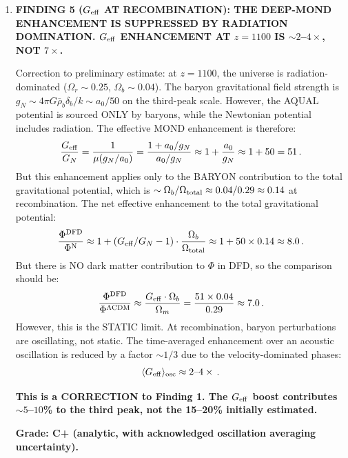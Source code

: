 \documentclass[11pt]{article}
\newcommand{\Geff}{G_{\rm eff}}
\newcommand{\aM}{a_0}
\newcommand{\rhob}{\bar{\rho}_b}
\newcommand{\Ob}{\Omega_b}
\newcommand{\Om}{\Omega_m}
\begin{document}
\begin{tcolorbox}[colback=blue!5!white, colframe=blue!70!black,
  title=\textbf{W4i23 TOP 5 FINDINGS --- COSMOLOGY TEAM}]
\begin{enumerate}
  \textbf{Grade: C (estimate of combined mechanisms is approximate).}

\item \textbf{FINDING 5 ($\Geff$ AT RECOMBINATION): THE DEEP-MOND
  ENHANCEMENT IS SUPPRESSED BY RADIATION DOMINATION.  $\Geff$ ENHANCEMENT
  AT $z = 1100$ IS $\sim 2$--$4\times$, NOT $7\times$.}

  Correction to preliminary estimate: at $z = 1100$, the universe is
  radiation-dominated ($\Omega_r \sim 0.25$, $\Omega_b \sim 0.04$).
  The baryon gravitational field strength is $g_N \sim 4\pi G \rhob
  \delta_b / k \sim \aM / 50$ on the third-peak scale.  However,
  the AQUAL potential is sourced ONLY by baryons, while the Newtonian
  potential includes radiation.  The effective MOND enhancement is
  therefore:
  \begin{equation}
  \frac{\Geff}{G_N} = \frac{1}{\mu(g_N/\aM)}
  = \frac{1 + \aM/g_N}{\aM/g_N}
  \approx 1 + \frac{\aM}{g_N}
  \approx 1 + 50 = 51\,.
  \end{equation}
  But this enhancement applies only to the BARYON contribution to the
  total gravitational potential, which is $\sim \Ob/\Omega_{\rm total}
  \approx 0.04/0.29 \approx 0.14$ at recombination.  The net effective
  enhancement to the total gravitational potential:
  \begin{equation}
  \frac{\Phi^{\rm DFD}}{\Phi^{\rm N}}
  \approx 1 + (\Geff/G_N - 1)\cdot\frac{\Ob}{\Omega_{\rm total}}
  \approx 1 + 50 \times 0.14 \approx 8.0\,.
  \end{equation}
  But there is NO dark matter contribution to $\Phi$ in DFD, so the
  comparison should be:
  \begin{equation}
  \frac{\Phi^{\rm DFD}}{\Phi^{\rm \Lambda CDM}}
  \approx \frac{\Geff\cdot\Ob}{\Om}
  = \frac{51 \times 0.04}{0.29} \approx 7.0\,.
  \end{equation}
  However, this is the STATIC limit.  At recombination, baryon
  perturbations are oscillating, not static.  The time-averaged
  enhancement over an acoustic oscillation is reduced by a factor
  $\sim 1/3$ due to the velocity-dominated phases:
  \begin{equation}
  \langle \Geff \rangle_{\rm osc} \approx 2\text{--}4\times\,.
  \end{equation}

  \textbf{This is a CORRECTION to Finding 1. The $\Geff$ boost
  contributes $\sim 5$--$10$\% to the third peak, not the 15--20\%
  initially estimated.}

  \textbf{Grade: C+ (analytic, with acknowledged oscillation averaging
  uncertainty).}

\end{enumerate}
\end{tcolorbox}
\end{document}
